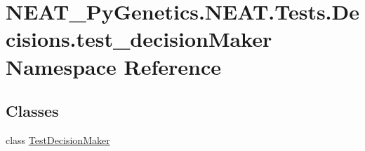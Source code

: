 \hypertarget{namespaceNEAT__PyGenetics_1_1NEAT_1_1Tests_1_1Decisions_1_1test__decisionMaker}{}\section{N\+E\+A\+T\+\_\+\+Py\+Genetics.\+N\+E\+A\+T.\+Tests.\+Decisions.\+test\+\_\+decision\+Maker Namespace Reference}
\label{namespaceNEAT__PyGenetics_1_1NEAT_1_1Tests_1_1Decisions_1_1test__decisionMaker}
\subsection*{Classes}
\begin{DoxyCompactItemize}
\item 
class \hyperlink{classNEAT__PyGenetics_1_1NEAT_1_1Tests_1_1Decisions_1_1test__decisionMaker_1_1TestDecisionMaker}{Test\+Decision\+Maker}
\end{DoxyCompactItemize}
